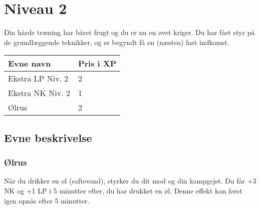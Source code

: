 \chapter*{Niveau 2}
Din hårde træning har båret frugt og du er nu en øvet kriger. Du har fået styr på de grundlæggende teknikker, og er begyndt få en (næsten) fast indkomst. 
\begin{table}[H]
    \centering
    \begin{tabular}{|p{}|p{}|}
    \rowcolor{cerulean!80}\hline
        Evne navn & Pris i XP \\\hline
         Ekstra LP Niv. 2 & 2 \\\hline
         Ekstra NK Niv. 2 & 1 \\\hline
         Ølrus & 2\\
         \hline
    \end{tabular}
\end{table}
\section*{Evne beskrivelse}





\subsection*{Ølrus}
Når du drikker en øl (saftevand), styrker du dit mod og din kampgejst. Du får +3
NK og +1 LP i 5 minutter efter, du har drukket en øl. Denne effekt kan først igen
opnås efter 5 minutter.\\